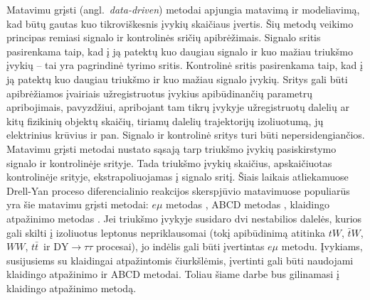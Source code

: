 \documentclass[a4paper, 12pt, oneside]{article}
\newcommand{\tbarW}{\bar{t}W}
\newcommand{\ttbar}{t\bar{t}}
\newcommand{\emu}{e\mu}
\newcommand{\DYtau}{\mathrm{DY} \! \rightarrow \! \tau\tau}
\begin{document}
Matavimu grįsti (angl.\ \textit{data-driven}) metodai apjungia matavimą ir modeliavimą, kad būtų gautas kuo
tikroviškesnis įvykių skaičiaus įvertis.
Šių metodų veikimo principas remiasi signalo ir kontrolinės sričių apibrėžimais.
Signalo sritis pasirenkama taip, kad į ją patektų kuo daugiau signalo ir kuo mažiau triukšmo įvykių -- tai yra pagrindinė
tyrimo sritis.
Kontrolinė sritis pasirenkama taip, kad į ją patektų kuo daugiau triukšmo ir kuo mažiau signalo įvykių.
Sritys gali būti apibrėžiamos įvairiais užregistruotus įvykius apibūdinančių parametrų apribojimais, pavyzdžiui,
apribojant tam tikrų įvykyje užregistruotų dalelių ar kitų fizikinių objektų skaičių, tiriamų dalelių trajektorijų izoliuotumą, jų
elektrinius krūvius ir pan.
Signalo ir kontrolinė sritys turi būti nepersidengiančios.
Matavimu grįsti metodai nustato sąsają tarp triukšmo įvykių pasiskirstymo signalo ir kontrolinėje srityje.
Tada triukšmo įvykių skaičius, apskaičiuotas kontrolinėje srityje, ekstrapoliuojamas į signalo sritį.
Šiais laikais atliekamuose Drell-Yan proceso diferencialinio reakcijos skerspjūvio matavimuose populiarūs yra šie matavimu
grįsti metodai: $\emu$ metodas \cite{DY_CMS2011, DY_CMS2013, DY_ATLAS2014, DY_CMS2015, DY_CMS2019},
ABCD metodas \cite{DY_CMS2011, DY_CMS2013, DY_ATLAS2014, DY_CMS2015, DY_ATLAS2016, DY_ATLAS2017},
klaidingo atpažinimo metodas \cite{DY_CMS2011, DY_CMS2013, DY_ATLAS2013, DY_CMS2015, DY_ATLAS2016, DY_CMS2019}.
Jei triukšmo įvykyje susidaro dvi nestabilios dalelės, kurios gali skilti į izoliuotus leptonus nepriklausomai
(tokį apibūdinimą atitinka $tW$, $\tbarW$, $WW$, $\ttbar\,$ ir $\DYtau$ procesai), jo indėlis gali būti įvertintas $\emu$ metodu.
Įvykiams, susijusiems su klaidingai atpažintomis čiurkšlėmis, įvertinti gali būti naudojami klaidingo atpažinimo ir ABCD metodai.
Toliau šiame darbe bus gilinamasi į klaidingo atpažinimo metodą.
\end{document}
